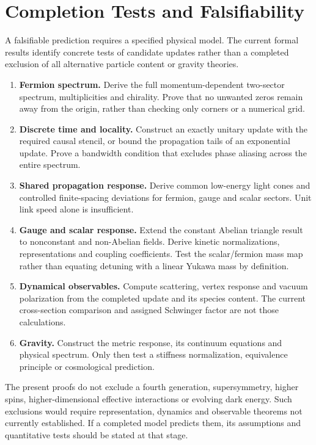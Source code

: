 \section{Completion Tests and Falsifiability}
\label{sec:falsifiability}

A falsifiable prediction requires a specified physical model. The current formal results identify concrete tests of candidate updates rather than a completed exclusion of all alternative particle content or gravity theories.

\begin{enumerate}
 \item \textbf{Fermion spectrum.} Derive the full momentum-dependent two-sector spectrum, multiplicities and chirality. Prove that no unwanted zeros remain away from the origin, rather than checking only corners or a numerical grid.
 \item \textbf{Discrete time and locality.} Construct an exactly unitary update with the required causal stencil, or bound the propagation tails of an exponential update. Prove a bandwidth condition that excludes phase aliasing across the entire spectrum.
 \item \textbf{Shared propagation response.} Derive common low-energy light cones and controlled finite-spacing deviations for fermion, gauge and scalar sectors. Unit link speed alone is insufficient.
 \item \textbf{Gauge and scalar response.} Extend the constant Abelian triangle result to nonconstant and non-Abelian fields. Derive kinetic normalizations, representations and coupling coefficients. Test the scalar/fermion mass map rather than equating detuning with a linear Yukawa mass by definition.
 \item \textbf{Dynamical observables.} Compute scattering, vertex response and vacuum polarization from the completed update and its species content. The current cross-section comparison and assigned Schwinger factor are not those calculations.
 \item \textbf{Gravity.} Construct the metric response, its continuum equations and physical spectrum. Only then test a stiffness normalization, equivalence principle or cosmological prediction.
\end{enumerate}

The present proofs do not exclude a fourth generation, supersymmetry, higher spins, higher-dimensional effective interactions or evolving dark energy. Such exclusions would require representation, dynamics and observable theorems not currently established. If a completed model predicts them, its assumptions and quantitative tests should be stated at that stage.
